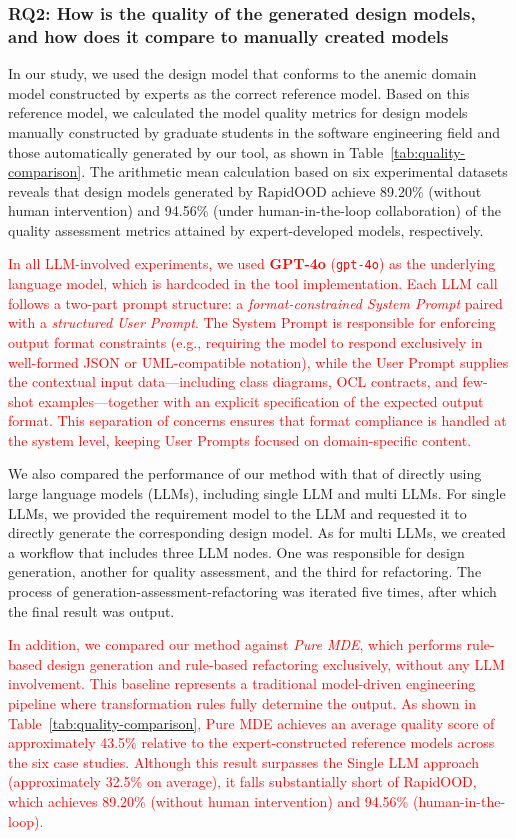 \documentclass[pdflatex,sn-mathphys-num]{sn-jnl}%
\theoremstyle{thmstyleone}%
\theoremstyle{thmstyletwo}%
\theoremstyle{thmstylethree}%
\begin{document}
\subsubsection{\textbf{RQ2:} How is the quality of the generated design models, and how does it compare to manually created models}
In our study, we used the design model that conforms to the anemic domain model constructed by experts as the correct reference model. Based on this reference model, we calculated the model quality metrics for design models manually constructed by graduate students in the software engineering field and those automatically generated by our tool, as shown in Table~\ref{tab:quality-comparison}. 
The arithmetic mean calculation based on six experimental datasets reveals that design models generated by RapidOOD achieve 89.20\% (without human intervention) and 94.56\% (under human-in-the-loop collaboration) of the quality assessment metrics attained by expert-developed models, respectively. 

\textcolor{red}{In all LLM-involved experiments, we used \textbf{GPT-4o} (\texttt{gpt-4o}) as the underlying language model, which is hardcoded in the tool implementation. Each LLM call follows a two-part prompt structure: a \textit{format-constrained System Prompt} paired with a \textit{structured User Prompt}. The System Prompt is responsible for enforcing output format constraints (e.g., requiring the model to respond exclusively in well-formed JSON or UML-compatible notation), while the User Prompt supplies the contextual input data---including class diagrams, OCL contracts, and few-shot examples---together with an explicit specification of the expected output format. This separation of concerns ensures that format compliance is handled at the system level, keeping User Prompts focused on domain-specific content.}

We also compared the performance of our method with that of directly using large language models (LLMs), including single LLM and multi LLMs.
For single LLMs, we provided the requirement model to the LLM and requested it to directly generate the corresponding design model. As for multi LLMs, we created a workflow that includes three LLM nodes. One was responsible for design generation, another for quality assessment, and the third for refactoring. The process of generation-assessment-refactoring was iterated five times, after which the final result was output.

\textcolor{red}{In addition, we compared our method against \textit{Pure MDE}, which performs rule-based design generation and rule-based refactoring exclusively, without any LLM involvement. This baseline represents a traditional model-driven engineering pipeline where transformation rules fully determine the output. As shown in Table~\ref{tab:quality-comparison}, Pure MDE achieves an average quality score of approximately 43.5\% relative to the expert-constructed reference models across the six case studies. Although this result surpasses the Single LLM approach (approximately 32.5\% on average), it falls substantially short of RapidOOD, which achieves 89.20\% (without human intervention) and 94.56\% (human-in-the-loop).}
\end{document}
